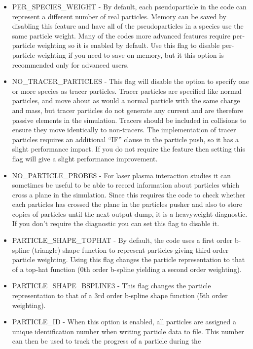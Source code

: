 \begin{itemize}
\item PER\_SPECIES\_WEIGHT - By default, each pseudoparticle in the code can
  represent a different number of real particles. Memory can be saved by
  disabling this feature and have all of the pseudoparticles in a species
  use the same particle weight. Many of the codes more advanced features
  require per-particle weighting so it is enabled by default.
  Use this flag to disable per-particle weighting if you need to save on
  memory, but it this option is recommended only for advanced users.
\item NO\_TRACER\_PARTICLES - This flag will disable the option to specify one
  or more species as
  tracer particles. Tracer particles are specified like normal particles, and
  move about as would a normal particle with the same charge and mass, but
  tracer particles do not generate any current and are therefore passive
  elements in the simulation. Tracers should be included in collisions to
  ensure they move identically to non-tracers. The implementation of tracer
  particles requires an additional ``IF'' clause
  in the particle push, so it has a slight performance impact. If you do not
  require the feature then setting this flag will give a slight performance
  improvement.
\item NO\_PARTICLE\_PROBES - For laser plasma interaction studies it can
  sometimes
  be useful to be able to record information about particles which cross a
  plane in the simulation. Since this requires the code to check whether each
  particles has crossed the plane in the particles pusher and also to store
  copies of particles until the next output dump, it is a heavyweight
  diagnostic. If you don't require the diagnostic you can set this flag to
  disable it.
\item PARTICLE\_SHAPE\_TOPHAT - By default, the code uses a first order
  b-spline (triangle) shape function to represent particles giving
  third order particle weighting.
  Using this flag changes the particle representation to that of a top-hat
  function (0th order b-spline yielding a second order weighting).
\item PARTICLE\_SHAPE\_BSPLINE3 - This flag changes the particle representation
  to that of a 3rd order b-spline shape function (5th order weighting).
\item PARTICLE\_ID - When this option is enabled, all particles are assigned
  a unique identification number when writing particle data to file. This
  number can then be used to track the progress of a particle during the

\end{itemize}
